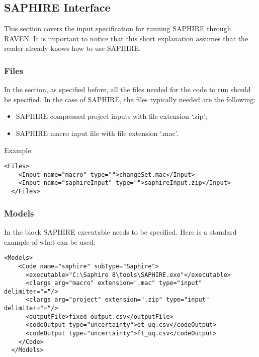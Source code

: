 \subsection{SAPHIRE Interface}
\label{subsec:saphireInterface}
This section covers the input specification for running SAPHIRE through RAVEN. It is important to notice
that this short explanation assumes that the reader already knows how to use SAPHIRE.

\subsubsection{Files}
In the  section, as specified before, all the files needed for the code to
run should be specified. In the case of SAPHIRE, the files typically needed are the following:
\begin{itemize}
  \item SAPHIRE compressed project inputs with file extension `.zip';
  \item SAPHIRE macro input file with file extension `.mac'.
\end{itemize}

Example:
\begin{lstlisting}[style=XML]
  <Files>
    <Input name="macro" type="">changeSet.mac</Input>
    <Input name="saphireInput" type="">saphireInput.zip</Input>
  </Files>
\end{lstlisting}

\subsubsection{Models}
In the  block SAPHIRE executable needs to be specified. Here is a standard example of what
can be used:
\begin{lstlisting}[style=XML]
  <Models>
    <Code name="saphire" subType="Saphire">
      <executable>"C:\Saphire 8\tools\SAPHIRE.exe"</executable>
      <clargs arg="macro" extension=".mac" type="input" delimiter="="/>
      <clargs arg="project" extension=".zip" type="input" delimiter="="/>
      <outputFile>fixed_output.csv</outputFile>
      <codeOutput type="uncertainty">et_uq.csv</codeOutput>
      <codeOutput type="uncertainty">ft_uq.csv</codeOutput>
    </Code>
  </Models>
\end{lstlisting}

